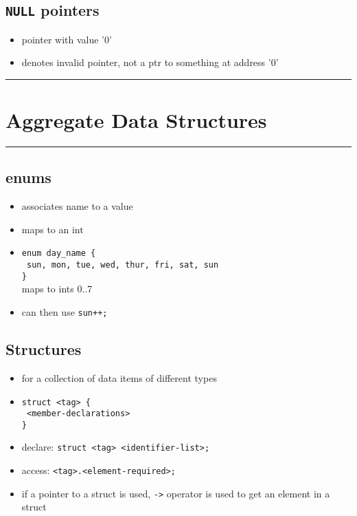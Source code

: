 \documentclass[10pt, multicolumn, a4paper]{article}
\begin{document}
\begin{multicols}{2}
	\subsection*{\texttt{NULL} pointers}
	\begin{itemize}
	\item pointer with value '0'
	\item denotes invalid pointer, not a ptr to something at address '0'
	\end{itemize}
\end{multicols}

\setcounter{section}{2} %
\hrule
\section{Aggregate Data Structures}
\hrule 

\begin{multicols}{2}
	\subsection*{enums}
	\begin{itemize}
	\item associates name to a value
	\item maps to an int
	\item \verb|enum day_name {| \\ \texttt{\hspace*{5mm} sun, mon, tue, wed, thur, fri, sat, sun} \\ \verb|}|
		\\ maps to ints 0..7
	\item can then use \verb|sun++;|
	\end{itemize}
	\subsection*{Structures}
	\begin{itemize}
	\item for a collection of data items of different types
	\item \verb|struct <tag> {|	\\ \texttt{\hspace*{5mm} <member-declarations>} \\ \verb|}|
	\item declare: \verb|struct <tag> <identifier-list>;|
	\item access: \verb|<tag>.<element-required>;|
	\item if a pointer to a struct is used, \verb|->| operator is used to get an element in a struct
	\end{itemize}
\end{multicols}
\end{document}
